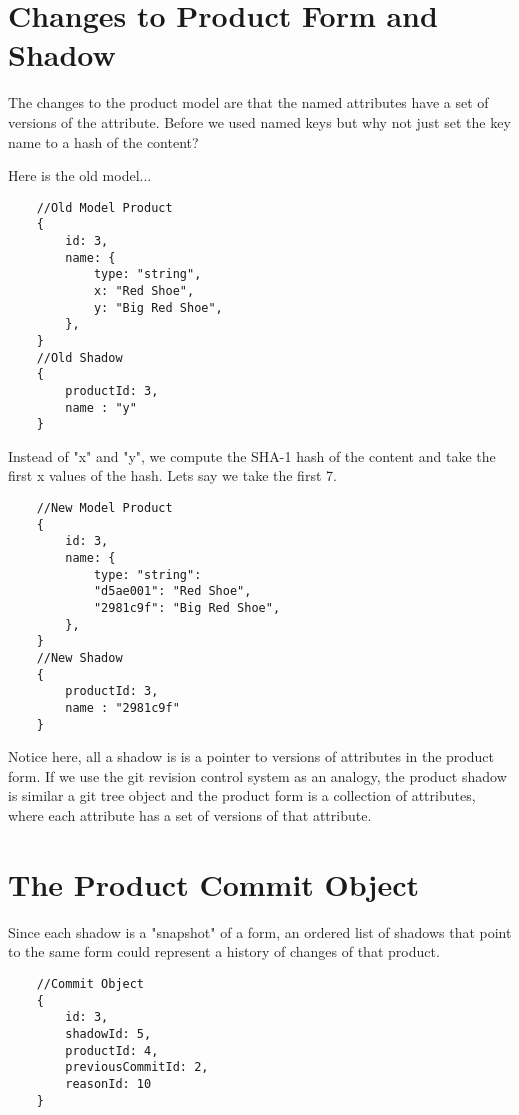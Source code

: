 \documentclass[11pt]{article}
\begin{document}
\section{Changes to Product Form and Shadow}

The changes to the product model are that the named attributes have a set 
of versions of the attribute. Before we used named keys but why not just
set the key name to a hash of the content?

Here is the old model...

\begin{lstlisting}
    //Old Model Product 
    {
        id: 3,
        name: { 
            type: "string", 
            x: "Red Shoe", 
            y: "Big Red Shoe", 
        },
    }
    //Old Shadow
    {
        productId: 3,
        name : "y"
    }
\end{lstlisting}

Instead of "x" and "y", we compute the SHA-1 hash of the content and take the
first x values of the hash. Lets say we take the first 7.

\begin{lstlisting}
    //New Model Product 
    {
        id: 3,
        name: { 
            type: "string": 
            "d5ae001": "Red Shoe", 
            "2981c9f": "Big Red Shoe", 
        },
    }
    //New Shadow
    {
        productId: 3,
        name : "2981c9f"
    }
\end{lstlisting}

Notice here, all a shadow is is a pointer to versions of attributes in the
product form. If we use the git revision control system as an analogy, the product 
shadow is similar a git tree object and the product form is a collection of 
attributes, where each attribute has a set of versions of that attribute.

\section{The Product Commit Object}

Since each shadow is a "snapshot" of a form, an ordered list of shadows that 
point to the same form could represent a history of changes of that product.

\begin{lstlisting}
    //Commit Object
    {
        id: 3,
        shadowId: 5,
        productId: 4,
        previousCommitId: 2,
        reasonId: 10
    }
\end{lstlisting}
\end{document}
